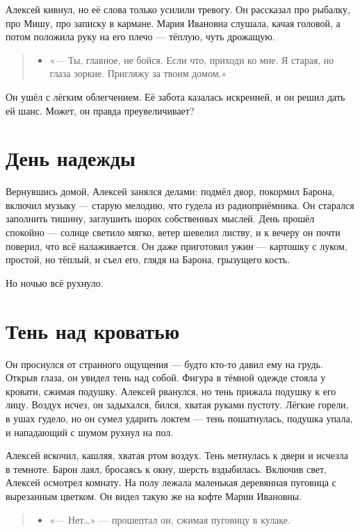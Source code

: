 \documentclass[12pt,a4paper]{book}
\newenvironment{dialogue}{\begin{quote}\itshape\begin{itemize}\item[]}{\end{itemize}\end{quote}}
\begin{document}
Алексей кивнул, но её слова только усилили тревогу. Он рассказал про рыбалку, про Мишу, про записку в кармане. Мария Ивановна слушала, качая головой, а потом положила руку на его плечо — тёплую, чуть дрожащую.

\begin{dialogue}
«— Ты, главное, не бойся. Если что, приходи ко мне. Я старая, но глаза зоркие. Пригляжу за твоим домом.»
\end{dialogue}

Он ушёл с лёгким облегчением. Её забота казалась искренней, и он решил дать ей шанс. Может, он правда преувеличивает?

\section{День надежды}

Вернувшись домой, Алексей занялся делами: подмёл двор, покормил Барона, включил музыку — старую мелодию, что гудела из радиоприёмника. Он старался заполнить тишину, заглушить шорох собственных мыслей. День прошёл спокойно — солнце светило мягко, ветер шевелил листву, и к вечеру он почти поверил, что всё налаживается. Он даже приготовил ужин — картошку с луком, простой, но тёплый, и съел его, глядя на Барона, грызущего кость.

Но ночью всё рухнуло.

\section{Тень над кроватью}

Он проснулся от странного ощущения — будто кто-то давил ему на грудь. Открыв глаза, он увидел тень над собой. Фигура в тёмной одежде стояла у кровати, сжимая подушку. Алексей рванулся, но тень прижала подушку к его лицу. Воздух исчез, он задыхался, бился, хватая руками пустоту. Лёгкие горели, в ушах гудело, но он сумел ударить локтем — тень пошатнулась, подушка упала, и нападающий с шумом рухнул на пол.

Алексей вскочил, кашляя, хватая ртом воздух. Тень метнулась к двери и исчезла в темноте. Барон лаял, бросаясь к окну, шерсть вздыбилась. Включив свет, Алексей осмотрел комнату. На полу лежала маленькая деревянная пуговица с вырезанным цветком. Он видел такую же на кофте Марии Ивановны.

\begin{dialogue}
«— Нет…» — прошептал он, сжимая пуговицу в кулаке.
\end{dialogue}
\end{document}
